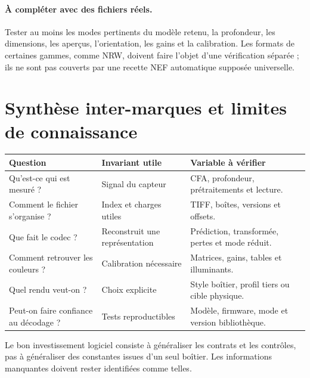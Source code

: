 \paragraph{À compléter avec des fichiers réels.} Tester
au moins les modes pertinents du modèle retenu,
la profondeur, les dimensions, les aperçus,
l'orientation, les gains et la calibration.
Les formats de certaines gammes, comme NRW,
doivent faire l'objet d'une vérification séparée ;
ils ne sont pas couverts par une recette NEF
automatique supposée universelle.

\section{Synthèse inter-marques et limites de connaissance}
\begin{longtable}{p{3.2cm}p{4cm}p{7.5cm}}
\toprule Question & Invariant utile & Variable à vérifier \\ \midrule
Qu'est-ce qui est mesuré ? & Signal du capteur & CFA, profondeur, prétraitements et lecture. \\
Comment le fichier s'organise ? & Index et charges utiles & TIFF, boîtes, versions et offsets. \\
Que fait le codec ? & Reconstruit une représentation & Prédiction, transformée, pertes et mode réduit. \\
Comment retrouver les couleurs ? & Calibration nécessaire & Matrices, gains, tables et illuminants. \\
Quel rendu veut-on ? & Choix explicite & Style boîtier, profil tiers ou cible physique. \\
Peut-on faire confiance au décodage ? & Tests reproductibles & Modèle, firmware, mode et version bibliothèque. \\
\bottomrule
\end{longtable}
Le bon investissement logiciel consiste à généraliser
les contrats et les contrôles, pas à généraliser des
constantes issues d'un seul boîtier. Les informations
manquantes doivent rester identifiées comme telles.
